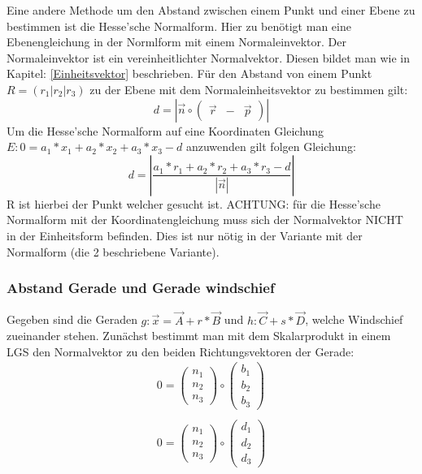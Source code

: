 \documentclass{article}
\begin{document}
Eine andere Methode um den Abstand zwischen einem Punkt und einer Ebene zu bestimmen ist die Hesse'sche Normalform. Hier zu benötigt man eine Ebenengleichung in der Normlform mit einem Normaleinvektor. Der Normaleinvektor ist ein vereinheitlichter Normalvektor. Diesen bildet man wie in Kapitel: \ref{Einheitsvektor} beschrieben. Für den Abstand von einem Punkt $R = (r_1 | r_2 | r_3)$ zu der Ebene mit dem Normaleinheitsvektor zu bestimmen gilt:
\begin{equation}
d = | \vec{n} \circ \begin{pmatrix} \vec{r} & - & \vec{p} \end{pmatrix} |
\end{equation}
Um die Hesse'sche Normalform auf eine Koordinaten Gleichung $E : 0 = a_1 * x_1 + a_2 * x_2 + a_3 * x_3 - d$ anzuwenden gilt folgen Gleichung:
\begin{equation}
d = | \frac{a_1 * r_1 + a_2 * r_2 + a_3 * r_3 - d}{ | \vec{n} | } |
\end{equation}
R ist hierbei der Punkt welcher gesucht ist. ACHTUNG: für die Hesse'sche Normalform mit der Koordinatengleichung muss sich der Normalvektor NICHT in der Einheitsform befinden. Dies ist nur nötig in der Variante mit der Normalform (die 2 beschriebene Variante).

\subsubsection{Abstand Gerade und Gerade windschief}
Gegeben sind die Geraden $g : \vec{x} = \vec{A} + r * \vec{B}$ und $h : \vec{C} + s * \vec{D}$, welche Windschief zueinander stehen. Zunächst bestimmt man mit dem Skalarprodukt in einem LGS den Normalvektor zu den beiden Richtungsvektoren der Gerade:
\begin{equation}
\begin{matrix}
0 = \begin{pmatrix} n_1 \\ n_2 \\ n_3 \end{pmatrix} \circ \begin{pmatrix} b_1 \\ b_2 \\ b_3 \end{pmatrix} \\
\\
0 = \begin{pmatrix} n_1 \\ n_2 \\ n_3 \end{pmatrix} \circ \begin{pmatrix} d_1 \\ d_2 \\ d_3 \end{pmatrix}
\end{matrix}
\end{equation}
\end{document}
